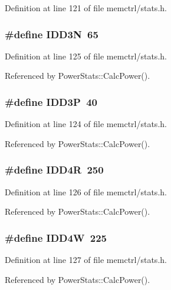 Definition at line 121 of file memctrl/stats.h.
\subsubsection[{IDD3N}]{\setlength{\rightskip}{0pt plus 5cm}\#define IDD3N~65}\label{memctrl_2stats_8h_308add993bb6cc0b4a85c178f08b7724}




Definition at line 125 of file memctrl/stats.h.

Referenced by PowerStats::CalcPower().
\subsubsection[{IDD3P}]{\setlength{\rightskip}{0pt plus 5cm}\#define IDD3P~40}\label{memctrl_2stats_8h_a8796a2d6af26cc54ed02cfa473bc940}




Definition at line 124 of file memctrl/stats.h.

Referenced by PowerStats::CalcPower().
\subsubsection[{IDD4R}]{\setlength{\rightskip}{0pt plus 5cm}\#define IDD4R~250}\label{memctrl_2stats_8h_d5b1fa999b5a43e0dc1936cc15c99972}




Definition at line 126 of file memctrl/stats.h.

Referenced by PowerStats::CalcPower().
\subsubsection[{IDD4W}]{\setlength{\rightskip}{0pt plus 5cm}\#define IDD4W~225}\label{memctrl_2stats_8h_752ac0260f3befd9243fab14a7ff0994}




Definition at line 127 of file memctrl/stats.h.

Referenced by PowerStats::CalcPower().

